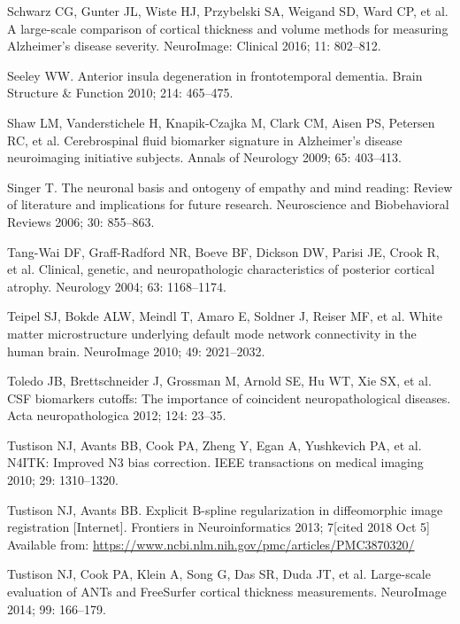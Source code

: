 \documentclass[]{article}
\begin{document}
\hypertarget{ref-schwarz_large-scale_2016}{}
Schwarz CG, Gunter JL, Wiste HJ, Przybelski SA, Weigand SD, Ward CP, et
al. A large-scale comparison of cortical thickness and volume methods
for measuring Alzheimer's disease severity. NeuroImage: Clinical 2016;
11: 802--812.

\hypertarget{ref-seeley_anterior_2010}{}
Seeley WW. Anterior insula degeneration in frontotemporal dementia.
Brain Structure \& Function 2010; 214: 465--475.

\hypertarget{ref-shaw_cerebrospinal_2009}{}
Shaw LM, Vanderstichele H, Knapik-Czajka M, Clark CM, Aisen PS, Petersen
RC, et al. Cerebrospinal fluid biomarker signature in Alzheimer's
disease neuroimaging initiative subjects. Annals of Neurology 2009; 65:
403--413.

\hypertarget{ref-singer_neuronal_2006}{}
Singer T. The neuronal basis and ontogeny of empathy and mind reading:
Review of literature and implications for future research. Neuroscience
and Biobehavioral Reviews 2006; 30: 855--863.

\hypertarget{ref-tang-wai_clinical_2004}{}
Tang-Wai DF, Graff-Radford NR, Boeve BF, Dickson DW, Parisi JE, Crook R,
et al. Clinical, genetic, and neuropathologic characteristics of
posterior cortical atrophy. Neurology 2004; 63: 1168--1174.

\hypertarget{ref-teipel_white_2010}{}
Teipel SJ, Bokde ALW, Meindl T, Amaro E, Soldner J, Reiser MF, et al.
White matter microstructure underlying default mode network connectivity
in the human brain. NeuroImage 2010; 49: 2021--2032.

\hypertarget{ref-toledo_csf_2012}{}
Toledo JB, Brettschneider J, Grossman M, Arnold SE, Hu WT, Xie SX, et
al. CSF biomarkers cutoffs: The importance of coincident
neuropathological diseases. Acta neuropathologica 2012; 124: 23--35.

\hypertarget{ref-tustison_n4itk:_2010}{}
Tustison NJ, Avants BB, Cook PA, Zheng Y, Egan A, Yushkevich PA, et al.
N4ITK: Improved N3 bias correction. IEEE transactions on medical imaging
2010; 29: 1310--1320.

\hypertarget{ref-tustison_explicit_2013}{}
Tustison NJ, Avants BB. Explicit B-spline regularization in
diffeomorphic image registration {[}Internet{]}. Frontiers in
Neuroinformatics 2013; 7{[}cited 2018 Oct 5{]} Available from:
\url{https://www.ncbi.nlm.nih.gov/pmc/articles/PMC3870320/}

\hypertarget{ref-tustison_large-scale_2014}{}
Tustison NJ, Cook PA, Klein A, Song G, Das SR, Duda JT, et al.
Large-scale evaluation of ANTs and FreeSurfer cortical thickness
measurements. NeuroImage 2014; 99: 166--179.
\end{document}

